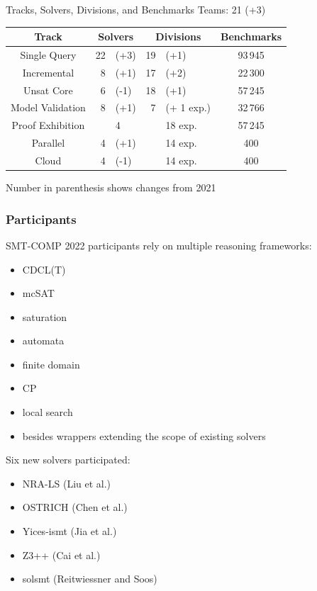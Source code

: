 \documentclass[table]{beamer}
\begin{document}
\begin{frame}{Tracks, Solvers, Divisions, and Benchmarks}
  Teams: 21 (+3)
  \bigskip

  \begin{tabular}{c|r@{}l|r@{}l|c}
    Track & \multicolumn{2}{c|}{Solvers} & \multicolumn{2}{c|}{Divisions}  & Benchmarks \\
    \hline
    Single Query  &  22&(+3)  & 19&(+1)  & 93\,945 \\
    Incremental &  8&(+1)   & 17&(+2)  & 22\,300   \\
    Unsat Core  &  6&(-1)   & 18&(+1)  & 57\,245  \\
    Model Validation  &  8&(+1)    &  7& (+ 1 exp.)  & 32\,766  \\
    Proof Exhibition  &  &4    &  & 18 exp.  & 57\,245  \\
    \hline
    Parallel &   4&(+1)      &   &14 exp.  & 400 \\
    Cloud & 4&(-1)      &  &14 exp.  & 400 \\

  \end{tabular}
  \bigskip

  Number in parenthesis shows changes from 2021
\end{frame}

\begin{frame}
  \frametitle{Participants}

  SMT-COMP 2022 participants rely on multiple reasoning frameworks:
  \begin{itemize}
  \item CDCL(T)
  \item mcSAT
  \item saturation
  \item automata
  \item finite domain
  \item CP
  \item local search
  \item besides wrappers extending the scope of existing solvers
  \end{itemize}

  \bigskip
  Six new solvers participated:
  \begin{itemize}
  \item NRA-LS   {\footnotesize (Liu et al.)}
  \item OSTRICH {\footnotesize (Chen et al.)}
  \item Yices-ismt {\footnotesize (Jia et al.)}
  \item Z3++ {\footnotesize (Cai et al.)}
  \item solsmt {\footnotesize (Reitwiessner and Soos)}
  \end{itemize}

\end{frame}
\end{document}
